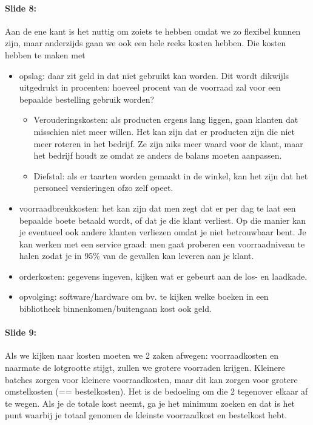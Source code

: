 \documentclass[10pt,a4paper]{report}
\begin{document}
\paragraph{Slide 8:} Aan de ene kant is het nuttig om zoiets te hebben omdat we zo flexibel kunnen zijn, maar anderzijds gaan we ook een hele reeks kosten hebben. Die kosten hebben te maken met
\begin{itemize}
\item opslag: daar zit geld in dat niet gebruikt kan worden. Dit wordt dikwijls uitgedrukt in procenten: hoeveel procent van de voorraad zal voor een bepaalde bestelling gebruik worden?
\begin{itemize}
\item Verouderingskosten: als producten ergens lang liggen, gaan klanten dat misschien niet meer willen. Het kan zijn dat er producten zijn die niet meer roteren in het bedrijf. Ze zijn niks meer waard voor de klant, maar het bedrijf houdt ze omdat ze anders de balans moeten aanpassen.
\item Diefstal: als er taarten worden gemaakt in de winkel, kan het zijn dat het personeel versieringen ofzo zelf opeet.
\end{itemize}
\item voorraadbreukkosten: het kan zijn dat men zegt dat er per dag te laat een bepaalde boete betaald wordt, of dat je die klant verliest. Op die manier kan je eventueel ook andere klanten verliezen omdat je niet betrouwbaar bent. Je kan werken met een service graad: men gaat proberen een voorraadniveau te halen zodat je in 95\% van de gevallen kan leveren aan je klant.
\item orderkosten: gegevens ingeven, kijken wat er gebeurt aan de los- en laadkade.
\item opvolging: software/hardware om bv. te kijken welke boeken in een bibliotheek binnenkomen/buitengaan kost ook geld.
\end{itemize}

\paragraph{Slide 9:} Als we kijken naar kosten moeten we 2 zaken afwegen: voorraadkosten en naarmate de lotgrootte stijgt, zullen we grotere voorraden krijgen. Kleinere batches zorgen voor kleinere voorraadkosten, maar dit kan zorgen voor grotere omstelkosten (== bestelkosten). Het is de bedoeling om die 2 tegenover elkaar af te wegen. Als je de totale kost neemt, ga je het minimum zoeken en dat is het punt waarbij je totaal genomen de kleinste voorraadkost en bestelkost hebt. 
\end{document}
